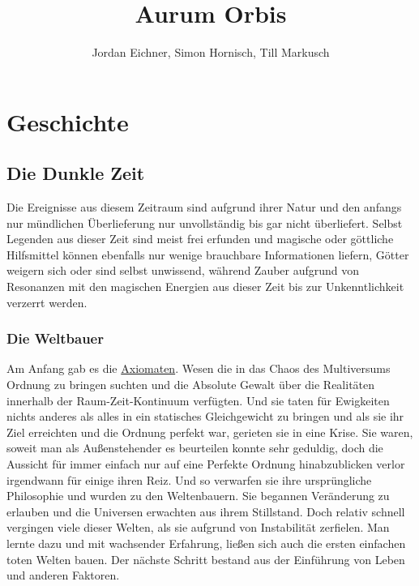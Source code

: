 \documentclass[a4paper,12pt,oneside]{book}
\title{Aurum Orbis}
\author{Jordan Eichner, Simon Hornisch, Till Markusch}
\date{}
\begin{document}
\maketitle
\tableofcontents

\part{Geschichte}
\chapter{Die Dunkle Zeit}
Die Ereignisse aus diesem Zeitraum sind aufgrund ihrer Natur und den anfangs nur mündlichen Überlieferung nur unvollständig bis gar nicht überliefert. Selbst Legenden aus dieser Zeit sind meist frei erfunden und magische oder göttliche Hilfsmittel können ebenfalls nur wenige brauchbare Informationen liefern, Götter weigern sich oder sind selbst unwissend, während Zauber aufgrund von Resonanzen mit den magischen Energien aus dieser Zeit bis zur Unkenntlichkeit verzerrt werden.

\section{Die Weltbauer}
Am Anfang gab es die \uline{Axiomaten}. Wesen die in das Chaos des Multiversums Ordnung zu bringen suchten und die Absolute Gewalt über die Realitäten innerhalb der Raum-Zeit-Kontinuum verfügten.   
Und sie taten für Ewigkeiten nichts anderes als alles in ein statisches Gleichgewicht zu bringen und als sie ihr Ziel erreichten und die Ordnung perfekt war, gerieten sie in eine Krise. Sie waren, soweit man als Außenstehender es beurteilen konnte sehr geduldig, doch die Aussicht für immer einfach nur auf eine Perfekte Ordnung hinabzublicken verlor irgendwann für einige ihren Reiz. Und so verwarfen sie ihre ursprüngliche Philosophie und wurden zu den Weltenbauern. Sie begannen Veränderung zu erlauben und die Universen erwachten aus ihrem Stillstand. Doch relativ schnell vergingen viele dieser Welten, als sie aufgrund von Instabilität zerfielen. Man lernte dazu und mit wachsender Erfahrung, ließen sich auch die ersten einfachen toten Welten bauen. Der nächste Schritt bestand aus der Einführung von Leben und anderen Faktoren.
\end{document}
